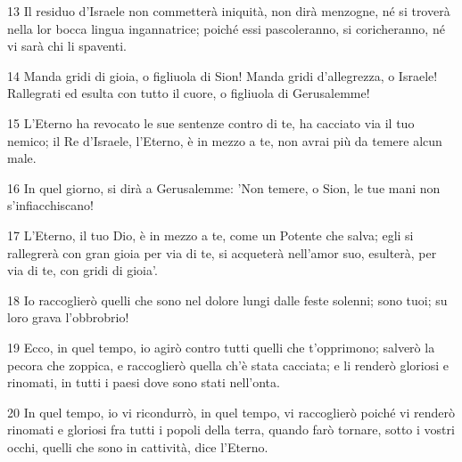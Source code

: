 \par 13 Il residuo d'Israele non commetterà iniquità, non dirà menzogne, né si troverà nella lor bocca lingua ingannatrice; poiché essi pascoleranno, si coricheranno, né vi sarà chi li spaventi.
\par 14 Manda gridi di gioia, o figliuola di Sion! Manda gridi d'allegrezza, o Israele! Rallegrati ed esulta con tutto il cuore, o figliuola di Gerusalemme!
\par 15 L'Eterno ha revocato le sue sentenze contro di te, ha cacciato via il tuo nemico; il Re d'Israele, l'Eterno, è in mezzo a te, non avrai più da temere alcun male.
\par 16 In quel giorno, si dirà a Gerusalemme: 'Non temere, o Sion, le tue mani non s'infiacchiscano!
\par 17 L'Eterno, il tuo Dio, è in mezzo a te, come un Potente che salva; egli si rallegrerà con gran gioia per via di te, si acqueterà nell'amor suo, esulterà, per via di te, con gridi di gioia'.
\par 18 Io raccoglierò quelli che sono nel dolore lungi dalle feste solenni; sono tuoi; su loro grava l'obbrobrio!
\par 19 Ecco, in quel tempo, io agirò contro tutti quelli che t'opprimono; salverò la pecora che zoppica, e raccoglierò quella ch'è stata cacciata; e li renderò gloriosi e rinomati, in tutti i paesi dove sono stati nell'onta.
\par 20 In quel tempo, io vi ricondurrò, in quel tempo, vi raccoglierò poiché vi renderò rinomati e gloriosi fra tutti i popoli della terra, quando farò tornare, sotto i vostri occhi, quelli che sono in cattività, dice l'Eterno.


